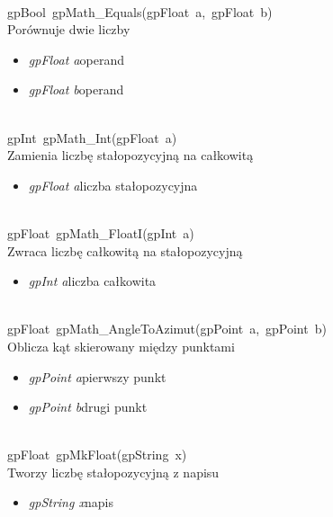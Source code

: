  \ \\
\mbox{\textsf{gpBool gpMath_Equals(gpFloat a, gpFloat b)}} \\ \indent Porównuje dwie liczby
	\begin{itemize}
		\item \textit{gpFloat a}\quad operand
		\item \textit{gpFloat b}\quad operand
	\end{itemize}

 \ \\
\mbox{\textsf{gpInt gpMath_Int(gpFloat a)}} \\ \indent Zamienia liczbę stałopozycyjną na całkowitą
	\begin{itemize}
		\item \textit{gpFloat a}\quad liczba stałopozycyjna
	\end{itemize}

 \ \\
\mbox{\textsf{gpFloat gpMath_FloatI(gpInt a)}} \\ \indent Zwraca liczbę całkowitą na stałopozycyjną
	\begin{itemize}
		\item \textit{gpInt a}\quad liczba całkowita
	\end{itemize}

 \ \\
\mbox{\textsf{gpFloat gpMath_AngleToAzimut(gpPoint a, gpPoint b)}} \\ \indent Oblicza kąt skierowany między punktami
	\begin{itemize}
		\item \textit{gpPoint a}\quad pierwszy punkt
		\item \textit{gpPoint b}\quad drugi punkt
	\end{itemize}

 \ \\
\mbox{\textsf{gpFloat gpMkFloat(gpString x)}} \\ \indent Tworzy liczbę stałopozycyjną z napisu
	\begin{itemize}
		\item \textit{gpString x}\quad napis
	\end{itemize}

 \ \\

